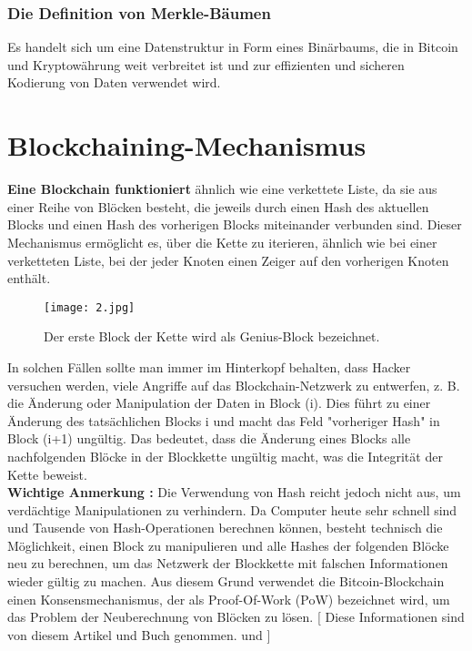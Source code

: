 \newpage
\subsubsection{Die Definition von Merkle-Bäumen}
Es handelt sich um eine Datenstruktur in Form eines Binärbaums, die in Bitcoin und Kryptowährung weit verbreitet ist und zur effizienten und sicheren Kodierung von Daten verwendet wird.

\section{Blockchaining-Mechanismus}
\textbf{Eine Blockchain funktioniert} ähnlich wie eine verkettete Liste, da sie aus einer Reihe von Blöcken besteht, die jeweils durch einen Hash des aktuellen Blocks und einen Hash des vorherigen Blocks miteinander verbunden sind. Dieser Mechanismus ermöglicht es, über die Kette zu iterieren, ähnlich wie bei einer verketteten Liste, bei der jeder Knoten einen Zeiger auf den vorherigen Knoten enthält.

\begin{figure}[h!]
	\centering
	\texttt{[image: 2.jpg]}
	\caption{Der erste Block der Kette wird als Genius-Block bezeichnet.}
	\small \cite{seven_image}
\end{figure} 
In solchen Fällen sollte man immer im Hinterkopf behalten, dass Hacker versuchen werden, viele Angriffe auf das Blockchain-Netzwerk zu entwerfen, z. B. die Änderung oder Manipulation der Daten in Block (i). Dies führt zu einer Änderung des tatsächlichen Blocks i und macht das Feld "vorheriger Hash" in Block (i+1) ungültig. Das bedeutet, dass die Änderung eines Blocks alle nachfolgenden Blöcke in der Blockkette ungültig macht, was die Integrität der Kette beweist.\\
\textbf{Wichtige Anmerkung :} Die Verwendung von Hash reicht jedoch nicht aus, um verdächtige Manipulationen zu verhindern. Da Computer heute sehr schnell sind und Tausende von Hash-Operationen berechnen können, besteht technisch die Möglichkeit, einen Block zu manipulieren und alle Hashes der folgenden Blöcke neu zu berechnen, um das Netzwerk der Blockkette mit falschen Informationen wieder gültig zu machen. Aus diesem Grund verwendet die Bitcoin-Blockchain einen Konsensmechanismus, der als Proof-Of-Work (PoW) bezeichnet wird, um das Problem der Neuberechnung von Blöcken zu lösen. [ Diese Informationen sind von diesem Artikel und Buch genommen. \cite{imran2018mastering} und \cite{fool} ]

